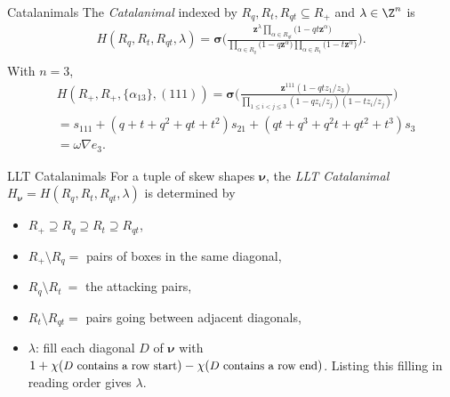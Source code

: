 \documentclass[dvipsnames]{beamer}
\newcommand{\zz}{{\boldsymbol z}}
\newcommand{\sigmabold}{\boldsymbol \sigma}
\newcommand{\nubold}{{\boldsymbol \nu }}
\theoremstyle{definition}
\begin{document}
\begin{frame}{Catalanimals}
The \emph{Catalanimal} indexed by $R_q, R_t, R_{qt} \subseteq R_+$ and $\lambda \in \Z^n$ is
\vspace{-.4mm}
\begin{align*}
H(R_q,R_t,R_{qt},\lambda)
 = \sigmabold
 \bigg(\frac{\zz ^\lambda \prod_{\alpha \in
R_{qt}} \big(1-q  t \zz ^\alpha \big)} {\prod_{\alpha \in R_q} \big(1-q \zz ^\alpha\big)
\prod_{\alpha \in R_t} \big(1-t \zz ^\alpha\big)} 
  \bigg).
 \\[-8.4mm]
\end{align*}
\pause
With  $n=3$,
\vspace{-3mm}
\begin{align*}
& \displaystyle H(R_+,R_+,\{\alpha_{13}\}, (111)) =
\sigmabold \Big( \frac{\zz^{111} (1 - q t z_{1} /z_3)}
{\prod_{1\le i < j \le 3}(1 - q z_{i}/ z_{j})(1 - t z_{i}/ z_{j})} \Big)  \\
&  = s_{111} + (q+t+q^2+qt+t^2)s_{21}+ (qt + q^3+ q^2t + qt^2+t^3)s_{3} \\
& = \omega \nabla e_3.
\end{align*}
\vspace{4mm}
\end{frame}
\begin{frame}{LLT Catalanimals}
  For a tuple of skew shapes $\nubold$, the \emph{LLT Catalanimal} $H_{\nubold} = H(R_q,R_t, R_{qt}, \lambda)$
is determined by
\vspace{1mm}
\begin{itemize}
\item $R_+ \supseteq R_q \supseteq R_t \supseteq R_{qt}$,
\item $R_+ \setminus R_q = $ pairs of boxes in the same diagonal,
\item $R_q \setminus R_t \ = $ the attacking pairs,
\item  $R_t \setminus R_{qt}  = $ pairs going between adjacent diagonals,
\item $\lambda$: fill each diagonal $D$ of $\nubold$ with
$1+\chi({\small \text{$D$ contains a row start}}) - \chi({\small \text{$D$ contains a row end}})$. \break
Listing this filling in reading order gives  $\lambda$.
\end{itemize}
\end{frame}
\end{document}
